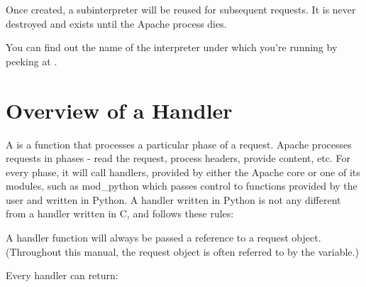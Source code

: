 Once created, a subinterpreter will be reused for subsequent requests.
It is never destroyed and exists until the Apache process dies.

You can find out the name of the interpreter under which you're
running by peeking at .

\begin{seealso}
\end{seealso}

\section{Overview of a Handler\label{pyapi-handler}}

A  is a function that processes a particular phase of a
request. Apache processes requests in phases - read the request,
process headers, provide content, etc. For every phase, it will call
handlers, provided by either the Apache core or one of its modules,
such as mod_python which passes control to functions provided by the
user and written in Python. A handler written in Python is not any
different from a handler written in C, and follows these rules:

  A handler function will always
be passed a reference to a request object. (Throughout this manual,
the request object is often referred to by the  variable.)

Every handler can return:


